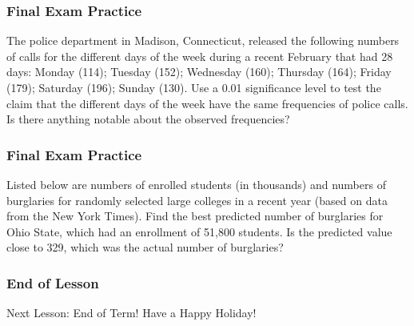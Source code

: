 \documentclass[xcolor=dvipsnames]{beamer} \usepackage{teachbeamer}
\begin{document}
\begin{frame}
  \frametitle{Final Exam Practice} {\ubung} The police department in Madison, Connecticut, released the following numbers of calls for the different days of the week during a recent February that had 28 days: Monday (114); Tuesday (152); Wednesday (160); Thursday (164); Friday (179); Saturday (196); Sunday (130). Use a 0.01 significance level to test the claim that the different days of the week have the same frequencies of police calls. Is there anything notable about the observed frequencies?
\end{frame}

\begin{frame}
  \frametitle{Final Exam Practice} {\ubung} Listed below are numbers of enrolled students (in thousands) and numbers of burglaries for randomly selected large colleges in a recent year (based on data from the New York Times). Find the best predicted number of burglaries for Ohio State, which had an enrollment of 51,800 students. Is the predicted value close to 329, which was the actual number of burglaries? %
\end{frame}

\begin{frame}
  \frametitle{End of Lesson} Next Lesson: End of Term! Have a Happy Holiday!
\end{frame}
\end{document}
